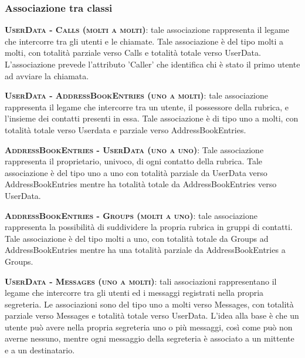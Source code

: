 \subsubsection{Associazione tra classi}

\begin{description}
	\item{\scshape\bfseries UserData - Calls (molti a molti)}: tale associazione rappresenta il legame che intercorre tra gli utenti e le chiamate. Tale associazione è del tipo molti a molti, con totalità parziale verso Calls e totalità totale verso UserData. L'associazione prevede l'attributo 'Caller' che identifica chi è stato il primo utente ad avviare la chiamata.
	
	\item{\scshape\bfseries UserData - AddressBookEntries (uno a molti)}: tale associazione rappresenta il legame che intercorre tra un utente, il possessore della rubrica, e l'insieme dei contatti presenti in essa. Tale associazione è di tipo uno a molti, con totalità totale verso Userdata e parziale verso AddressBookEntries.
	
	\item{\scshape\bfseries AddressBookEntries - UserData (uno a uno)}: Tale associazione rappresenta il proprietario, univoco, di ogni contatto della rubrica. Tale associazione è del tipo uno a uno con totalità parziale da UserData verso AddressBookEntries mentre ha totalità totale da AddressBookEntries verso UserData.
	
	\item{\scshape\bfseries AddressBookEntries - Groups (molti a uno)}: tale associazione rappresenta la possibilità di suddividere la propria rubrica in gruppi di contatti. Tale associazione è del tipo molti a uno, con totalità totale da Groups ad AddressBookEntries mentre ha una totalità parziale da AddressBookEntries a Groups.
	
	\item{\scshape\bfseries UserData - Messages (uno a molti)}: tali associazioni rappresentano il legame che intercorre tra gli utenti ed i messaggi registrati nella propria segreteria. Le associazioni sono del tipo uno a molti verso Messages, con totalità parziale verso Messages e totalità totale verso UserData. L'idea alla base è che un utente può avere nella propria segreteria uno o più messaggi, così come può non averne nessuno, mentre ogni messaggio della segreteria è associato a un mittente e a un destinatario.
\end{description}

